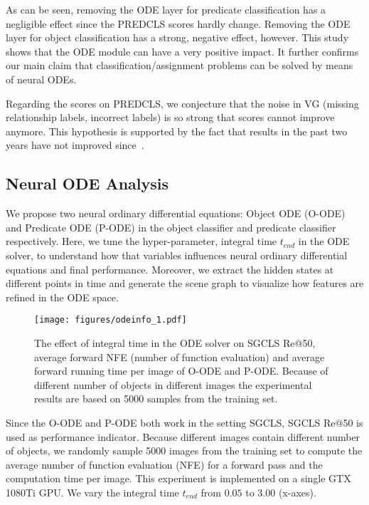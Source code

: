 \documentclass[runningheads]{llncs}
\begin{document}
As can be seen, removing the ODE layer for predicate classification has a negligible effect since the PREDCLS scores hardly change. Removing the ODE layer for object classification has a strong, negative effect, however. This study shows that the ODE module can have a very positive impact. It further confirms our main claim that classification/assignment problems can be solved by means of neural ODEs. 

Regarding the scores on PREDCLS, we conjecture that the noise in VG (missing relationship labels, incorrect labels) is so strong that scores cannot improve anymore. This hypothesis is supported by the fact that results in the past two years have not improved since~\cite{zellers2018neural}.



\subsection{Neural ODE Analysis}
\label{subsec:time}

We propose two neural ordinary differential equations: Object ODE (O-ODE) and Predicate ODE (P-ODE) in the object classifier and predicate classifier respectively. Here, we tune the hyper-parameter, integral time $t_{end}$ in the ODE solver, to understand how that variables  influences neural ordinary differential equations and final performance. Moreover, we extract the hidden states at different points in time and generate the scene graph to visualize how features are refined in the ODE space. 

\begin{figure*}[!ht]
\centering
    \texttt{[image: figures/odeinfo\_1.pdf]}
    \caption{The effect of integral time in the ODE solver on SGCLS Re@50, average forward NFE (number of function evaluation) and average forward running time per image of O-ODE and P-ODE. Because of different number of objects in different images the experimental results are based on 5000 samples from the training set.} \label{fig:ode_info}
\end{figure*}

Since the O-ODE and P-ODE both work in the setting SGCLS, SGCLS Re@50 is used as performance indicator. Because different images contain different number of objects, we randomly sample 5000 images from the training set to compute the average number of function evaluation (NFE) for a forward pass and the computation time per image. This experiment is implemented on a single GTX 1080Ti GPU. 
We vary the integral time $t_{end}$ from $0.05$ to $3.00$ (x-axes). 
\end{document}
